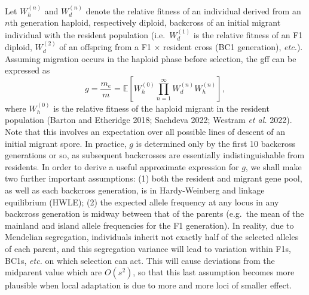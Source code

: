 \documentclass[
  11pt,
]{article}
\begin{document}
Let \(W_h^{(n)}\) and \(W_d^{(n)}\) denote the relative fitness of an
individual derived from an \(n\)th generation haploid, respectively
diploid, backcross of an initial migrant individual with the resident
population (i.e.~\(W_d^{(1)}\) is the relative fitness of an F1 diploid,
\(W_d^{(2)}\) of an offspring from a F1 \(\times\) resident cross (BC1
generation), \emph{etc.}). Assuming migration occurs in the haploid
phase before selection, the gff can be expressed as \begin{equation}
  g = \frac{m_e}{m} = \mathbb{E}\left[W_h^{(0)}\prod^\infty_{n=1}W_d^{(n)}W_h^{(n)}\right],
\end{equation} where \(W_h^{(0)}\) is the relative fitness of the
haploid migrant in the resident population (Barton and Etheridge 2018;
Sachdeva 2022; Westram \emph{et al.} 2022). Note that this involves an
expectation over all possible lines of descent of an initial migrant
spore. In practice, \(g\) is determined only by the first 10 backcross
generations or so, as subsequent backcrosses are essentially
indistinguishable from residents. In order to derive a useful
approximate expression for \(g\), we shall make two further important
assumptions: (1) both the resident and migrant gene pool, as well as
each backcross generation, is in Hardy-Weinberg and linkage equilibrium
(HWLE); (2) the expected allele frequency at any locus in any backcross
generation is midway between that of the parents (e.g.~the mean of the
mainland and island allele frequencies for the F1 generation). In
reality, due to Mendelian segregation, individuals inherit not exactly
half of the selected alleles of each parent, and this segregation
variance will lead to variation within F1s, BC1s, \emph{etc.} on which
selection can act. This will cause deviations from the midparent value
which are \(O(s^2)\), so that this last assumption becomes more
plausible when local adaptation is due to more and more loci of smaller
effect.
\end{document}
